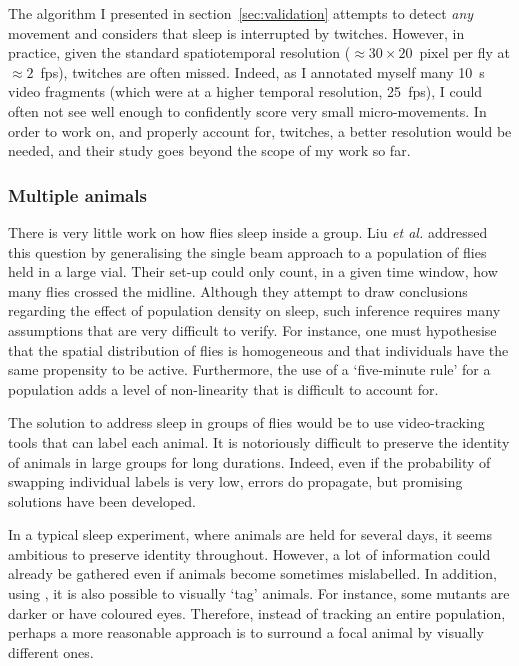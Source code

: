 The algorithm I presented in section~\ref{sec:validation} attempts to detect \emph{any} movement
and considers that sleep is interrupted by twitches. 
However, in practice, given the standard spatiotemporal resolution ($\approx30\times{}20$~pixel per fly at $\approx{}2$~\acrshort{fps}), twitches are often missed. 
Indeed, as I annotated myself many 10~s video fragments (which were at a higher temporal resolution, 25~\acrshort{fps}), 
I could often not see well enough to confidently score very small micro-movements.
In order to work on, and properly account for, twitches, a better resolution would be needed, and their study goes beyond the scope of my work so far.


\subsubsection{Multiple animals}

There is very little work on how flies sleep inside a group.
Liu \emph{et al.} addressed this question by generalising the single beam approach to a population of flies held in a large vial\cite{liu_sleep_2015}.
Their set-up could only count, in a given time window, how many flies crossed the midline.
Although they attempt to draw conclusions regarding the effect of population density on sleep, such inference requires many assumptions that are very difficult to verify.
For instance, one must hypothesise that the spatial distribution of flies is homogeneous and that individuals have the same propensity to be active. 
Furthermore, the use of a `five-minute rule' for a population adds a level of non-linearity that is difficult to account for. 

The solution to address sleep in groups of flies would be to use video-tracking tools that can label each animal.
It is notoriously difficult to preserve the identity of animals in large groups for long durations\cite{swierczek_high-throughput_2011}.
Indeed, even if the probability of swapping individual labels is very low, errors do propagate, but promising solutions have been developed\cite{swierczek_high-throughput_2011,perez-escudero_idtracker_2014,romero-ferrero_idtracker.ai_2018}.

In a typical sleep experiment, where animals are held for several days, it seems ambitious to preserve identity throughout. However, a lot of information could already be gathered even if animals become sometimes mislabelled.
In addition, using \droso{}, it is also possible to visually `tag' animals.
For instance, some mutants are darker or have coloured eyes.
Therefore, instead of tracking an entire population, perhaps a more reasonable approach is to surround a focal animal by visually different ones.


